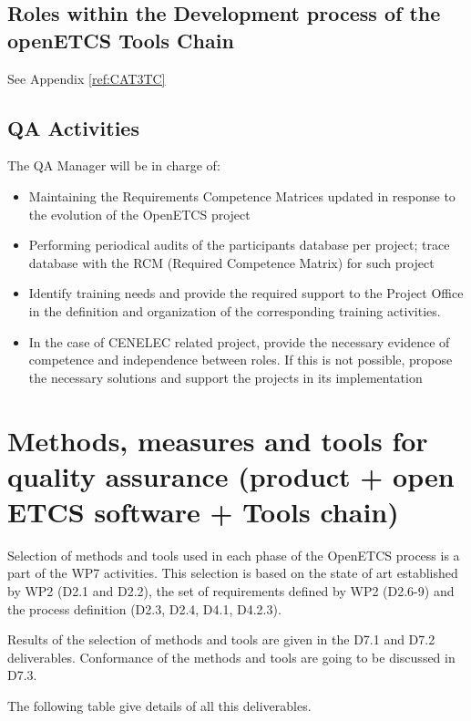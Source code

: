 \documentclass{template/openetcs_article}
\begin{document}
\subsection{Roles within the Development process of the openETCS Tools Chain}

See Appendix \ref{ref:CAT3TC}
\subsection{QA Activities}

The QA Manager will be in charge of:
\begin{itemize}
\item Maintaining the Requirements Competence Matrices updated in response to the evolution of the OpenETCS project
\item Performing periodical audits of the participants{\textquotesingle} database per project; trace database with the RCM (Required Competence Matrix) for such project
\item Identify training needs and provide the required support to the Project Office in the definition and organization of the corresponding training activities.
\item In the case of CENELEC related project, provide the necessary evidence of competence and independence between roles. If this is not possible, propose the necessary solutions and support the projects in its implementation
\end{itemize}

\section{Methods, measures and tools for quality assurance (product + open \gls{ETCS} software + Tools chain)}


Selection of methods and tools used in each phase of the OpenETCS process is a part of the WP7 activities. This selection is based on the state of art established by WP2 (D2.1 and D2.2), the set of requirements defined by WP2 (D2.6-9) and the process definition (D2.3, D2.4, D4.1, D4.2.3).

Results of the selection of methods and tools are given in the D7.1 and D7.2 deliverables. Conformance of the methods and tools are going to be discussed in D7.3.

The following table give details of all this deliverables.
\end{document}
